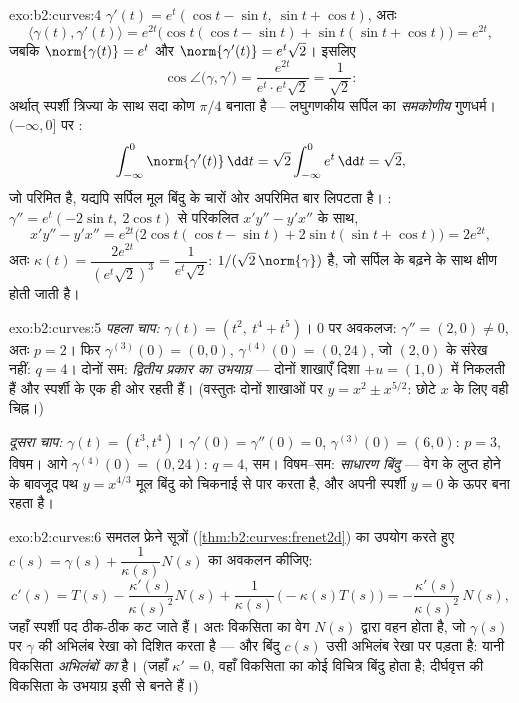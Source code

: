 \begin{solution}{exo:b2:curves:4}
$\gamma'(t) = e^t(\cos t - \sin t,\ \sin t + \cos t)$, अतः
\[
\langle \gamma(t), \gamma'(t)\rangle = e^{2t}
\bigl(\cos t(\cos t - \sin t) + \sin t(\sin t + \cos t)\bigr)
= e^{2t},
\]
जबकि $\norm{\gamma(t)} = e^t$ और $\norm{\gamma'(t)} =
e^t\sqrt 2$। इसलिए
\[
\cos\angle\bigl(\gamma, \gamma'\bigr)
= \frac{e^{2t}}{e^t \cdot e^t\sqrt2} = \frac{1}{\sqrt2} :
\]
अर्थात् स्पर्शी त्रिज्या के साथ सदा कोण $\pi/4$ बनाता है --- लघुगणकीय
सर्पिल का \emph{समकोणीय} गुणधर्म। $(-\infty, 0]$ पर :
\[
\int_{-\infty}^0 \norm{\gamma'(t)}\,\dd t
= \sqrt2\int_{-\infty}^0 e^t\,\dd t = \sqrt 2 ,
\]
जो परिमित है, यद्यपि सर्पिल मूल बिंदु के चारों ओर अपरिमित बार लिपटता
है। : $\gamma'' =
e^t(-2\sin t,\ 2\cos t)$ से परिकलित $x'y'' - y'x''$ के साथ,
\[
x'y'' - y'x'' = e^{2t}\bigl(2\cos t(\cos t - \sin t)
+ 2\sin t(\sin t + \cos t)\bigr) = 2e^{2t},
\]
अतः $\kappa(t) = \dfrac{2e^{2t}}{(e^t\sqrt2)^3} =
\dfrac{1}{e^t\sqrt2}$:  $1/(\sqrt2\,
\norm{\gamma})$ है, जो सर्पिल के बढ़ने के साथ क्षीण
होती जाती है।
\end{solution}

\begin{solution}{exo:b2:curves:5}
\emph{पहला चाप:} $\gamma(t) = (t^2,\ t^4 + t^5)$। $0$ पर अवकलज:
$\gamma'' = (2, 0) \neq 0$, अतः $p = 2$। फिर $\gamma^{(3)}(0)
= (0, 0)$, $\gamma^{(4)}(0) = (0, 24)$, जो $(2,
0)$ के संरेख नहीं: $q = 4$। दोनों सम: \emph{द्वितीय प्रकार का उभयाग्र} ---
दोनों शाखाएँ दिशा $+u = (1,0)$ में निकलती हैं और स्पर्शी के एक ही ओर
रहती हैं। (वस्तुतः दोनों शाखाओं पर $y = x^2 \pm x^{5/2}$: छोटे $x$
के लिए वही चिह्न।)

\emph{दूसरा चाप:} $\gamma(t) = (t^3, t^4)$। $\gamma'(0) =
\gamma''(0) = 0$, $\gamma^{(3)}(0) = (6, 0)$: $p = 3$, विषम। आगे
$\gamma^{(4)}(0) = (0, 24)$: $q = 4$, सम। विषम--सम:
\emph{साधारण बिंदु} --- वेग के लुप्त होने के बावजूद पथ $y = x^{4/3}$ मूल
बिंदु को चिकनाई से पार करता है, और अपनी स्पर्शी $y = 0$ के ऊपर बना रहता है।
\end{solution}

\begin{solution}{exo:b2:curves:6}
समतल फ्रेने सूत्रों
(\cref{thm:b2:curves:frenet2d}) का उपयोग करते हुए $c(s) = \gamma(s) + \dfrac{1}{\kappa(s)}N(s)$ का अवकलन कीजिए:
\[
c'(s) = T(s) - \frac{\kappa'(s)}{\kappa(s)^2}N(s)
+ \frac{1}{\kappa(s)}\,\bigl(-\kappa(s)T(s)\bigr)
= -\frac{\kappa'(s)}{\kappa(s)^2}\,N(s) ,
\]
जहाँ स्पर्शी पद ठीक-ठीक कट जाते हैं। अतः विकसिता का वेग $N(s)$ द्वारा
वहन होता है, जो $\gamma(s)$ पर $\gamma$ की अभिलंब रेखा को दिशित करता है
--- और बिंदु $c(s)$ उसी अभिलंब रेखा पर पड़ता है: यानी विकसिता
\emph{अभिलंबों का } है। (जहाँ $\kappa' = 0$, वहाँ विकसिता का
कोई विचित्र बिंदु होता है; दीर्घवृत्त की विकसिता के उभयाग्र इसी से बनते हैं।)
\end{solution}

